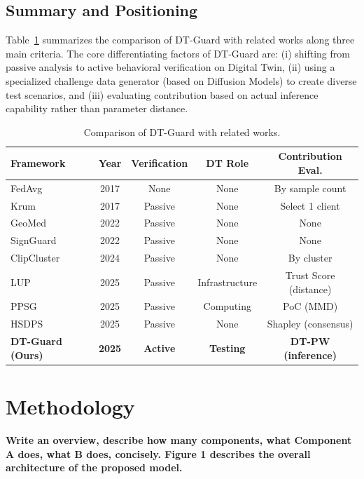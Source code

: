 \documentclass[runningheads]{llncs}
\begin{document}
\subsection{Summary and Positioning}

Table~\ref{tab:related_comparison} summarizes the comparison of DT-Guard with related works along three main criteria. The core differentiating factors of DT-Guard are: (i) shifting from passive analysis to active behavioral verification on Digital Twin, (ii) using a specialized challenge data generator (based on Diffusion Models) to create diverse test scenarios, and (iii) evaluating contribution based on actual inference capability rather than parameter distance.

\begin{table}[t]
\caption{Comparison of DT-Guard with related works.}
\label{tab:related_comparison}
\centering
\footnotesize
\begin{tabular}{lcccc}
\hline
\textbf{Framework} & \textbf{Year} & \textbf{Verification} & \textbf{DT Role} & \textbf{Contribution Eval.} \\
\hline
FedAvg~\cite{mcmahan2016communication} & 2017 & None & None & By sample count \\
Krum~\cite{blanchard2017machine} & 2017 & Passive & None & Select 1 client \\
GeoMed~\cite{pillutla2022robust} & 2022 & Passive & None & None \\
SignGuard~\cite{xu2022signguard} & 2022 & Passive & None & None \\
ClipCluster~\cite{zeng2024clipcluster} & 2024 & Passive & None & By cluster \\
LUP~\cite{issa2025dtbfl} & 2025 & Passive & Infrastructure & Trust Score (distance) \\
PPSG~\cite{zhang2025ppsg} & 2025 & Passive & Computing & PoC (MMD) \\
HSDPS~\cite{zhang2025bcsm} & 2025 & Passive & None & Shapley (consensus) \\
\hline
\textbf{DT-Guard (Ours)} & \textbf{2025} & \textbf{Active} & \textbf{Testing} & \textbf{DT-PW (inference)} \\
\hline
\end{tabular}
\end{table}

\section{Methodology}
\textbf{Write an overview, describe how many components, what Component A does, what B does, concisely. Figure 1 describes the overall architecture of the proposed model.}
\end{document}
